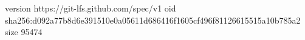 version https://git-lfs.github.com/spec/v1
oid sha256:d092a77b8d6e391510e0a05611d686416f1605cf496f81126615515a10b785a2
size 95474
